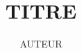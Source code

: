 \enlargethispage{2cm} %


\newcommand{\blap}[1]{\vbox to 0pt{#1\vss}}
\newcommand\AtUpperLeftCorner[3]{
  \put(\LenToUnit{#1},\LenToUnit{\dimexpr\paperheight-#2}){\blap{#3}}
}

\newcommand\AtUpperRightCorner[3]{
  \put(\LenToUnit{\dimexpr\paperwidth-#1},\LenToUnit{\dimexpr\paperheight-#2}){\blap{\llap{#3}}}
}
 
\title{\LARGE{TITRE}}
\author{AUTEUR}

\makeatletter 







	\hypersetup{pdfborder=0 0 0} %

	
	\renewcommand{\thepage}{\arabic{page}}
	\setcounter{page}{1}
	

	\tableofcontents %
	\newpage %